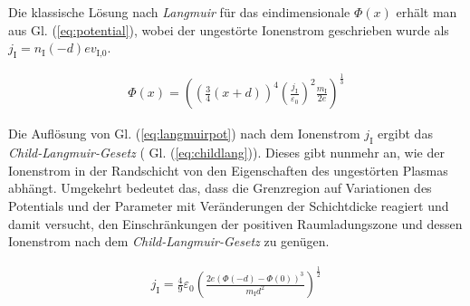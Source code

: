 \documentclass[numbers=noenddot,a4paper]{scrartcl}
\newcommand{\ix}[1]{_\text{#1}}
\newcommand{\tilt}[1]{\textit{#1}}
\begin{document}
		Die klassische Lösung nach \tilt{Langmuir} für das eindimensionale $\Phi\left(x\right)$ erhält man aus Gl. (\ref{eq:potential}), wobei der ungestörte Ionenstrom geschrieben wurde als $j\ix{I}=n\ix{I}\left(-d\right)ev\ix{I,0}$.
		
			\begin{align}
				\Phi\left(x\right)=\left(\left(\frac{3}{4}\left(x+d\right)\right)^4\left(\frac{j\ix{I}}{\varepsilon\ix{0}}\right)^2\frac{m\ix{I}}{2e}\right)^{\frac{1}{3}}  \label{eq:langmuirpot}
			\end{align}
			
		Die Auflösung von Gl. (\ref{eq:langmuirpot}) nach dem Ionenstrom $j\ix{I}$ ergibt das \tilt{Child-Langmuir-Gesetz} ( Gl. (\ref{eq:childlang})). Dieses gibt nunmehr an, wie der Ionenstrom in der Randschicht von den Eigenschaften des ungestörten Plasmas abhängt. Umgekehrt bedeutet das, dass die Grenzregion auf Variationen des Potentials und der Parameter mit Veränderungen der Schichtdicke reagiert und damit versucht, den Einschränkungen der positiven Raumladungszone und dessen Ionenstrom nach dem \tilt{Child-Langmuir-Gesetz} zu genügen.
		
			\begin{align}
				j\ix{I}=\frac{4}{9}\varepsilon\ix{0}\left(\frac{2e\left(\Phi\left(-d\right)-\Phi\left(0\right)\right)^3}{m\ix{I}d^2}\right)^{\frac{1}{2}} \label{eq:childlang}
			\end{align}
		
\end{document}
